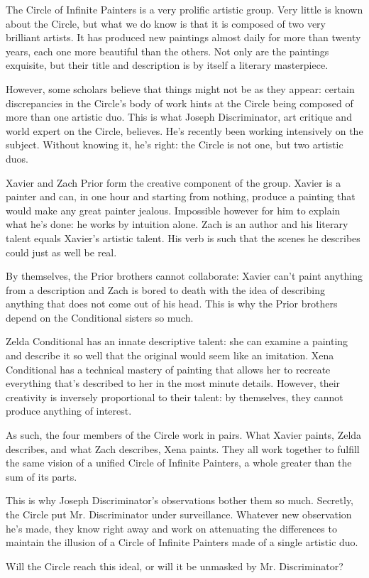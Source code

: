 \documentclass{article}
\begin{document}
The Circle of Infinite Painters is a very prolific artistic group. Very little
is known about the Circle, but what we do know is that it is composed of two
very brilliant artists. It has produced new paintings almost daily for more than
twenty years, each one more beautiful than the others. Not only are the
paintings exquisite, but their title and description is by itself a literary
masterpiece.

However, some scholars believe that things might not be as they appear: certain
discrepancies in the Circle's body of work hints at the Circle being composed of
more than one artistic duo. This is what Joseph Discriminator, art critique and
world expert on the Circle, believes. He's recently been working intensively on
the subject. Without knowing it, he's right: the Circle is not one, but two
artistic duos.

Xavier and Zach Prior form the creative component of the group. Xavier is a
painter and can, in one hour and starting from nothing, produce a painting that
would make any great painter jealous. Impossible however for him to explain
what he's done: he works by intuition alone. Zach is an author and his literary
talent equals Xavier's artistic talent. His verb is such that the scenes he
describes could just as well be real.

By themselves, the Prior brothers cannot collaborate: Xavier can't paint
anything from a description and Zach is bored to death with the idea of
describing anything that does not come out of his head. This is why the Prior
brothers depend on the Conditional sisters so much.

Zelda Conditional has an innate descriptive talent: she can examine a painting
and describe it so well that the original would seem like an imitation. Xena
Conditional has a technical mastery of painting that allows her to recreate
everything that's described to her in the most minute details. However, their
creativity is inversely proportional to their talent: by themselves, they cannot
produce anything of interest.

As such, the four members of the Circle work in pairs. What Xavier paints, Zelda
describes, and what Zach describes, Xena paints. They all work together to
fulfill the same vision of a unified Circle of Infinite Painters, a whole greater
than the sum of its parts.

This is why Joseph Discriminator's observations bother them so much. Secretly,
the Circle put Mr. Discriminator under surveillance. Whatever new observation
he's made, they know right away and work on attenuating the differences to
maintain the illusion of a Circle of Infinite Painters made of a single artistic
duo.

Will the Circle reach this ideal, or will it be unmasked by Mr. Discriminator?
\end{document}
